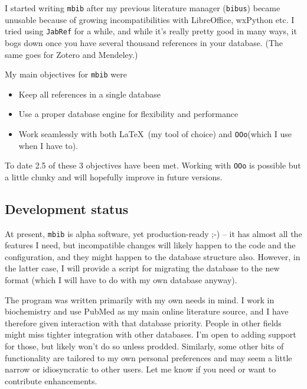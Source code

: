 \documentclass[10pt]{article}
\newcommand*{\mbib}{\texttt{mbib}\xspace}
\newcommand*{\jabref}{\texttt{JabRef}\xspace}
\newcommand*{\ooo}{\texttt{OOo}\xspace}
\begin{document}
I started writing \mbib after my previous literature manager (\texttt{bibus}) became unusable because of growing incompatibilities with LibreOffice, wxPython etc. I tried using \jabref for a while, and while it's really pretty good in many ways, it bogs down once you have several thousand references in your database. (The same goes for Zotero and Mendeley.)

\medskip

\noindent My main objectives for \mbib were 

\begin{itemize}
\item Keep all references in a single database
\item Use a proper database engine for flexibility and performance
\item Work seamlessly with both \LaTeX\ (my tool of choice) and \ooo (which I use when I have to). 
\end{itemize}

\noindent To date 2.5 of these 3 objectives have been met. Working with \ooo is possible but a little clunky and will hopefully improve in future versions. 

%

\subsection{Development status}

At present, \mbib is alpha software, yet production-ready ;-) -- it has almost all the features I need, but incompatible changes will likely happen to the code and the configuration, and they might happen to the database structure also. However, in the latter case, I will provide a script for migrating the database to the new format (which I will have to do with my own database anyway). 

The program was written primarily with my own needs in mind. I work in biochemistry and use PubMed as my main online literature source, and I have therefore given interaction with that database priority. People in other fields might miss tighter integration with other databases. I'm open to adding support for those, but likely won't do so unless prodded. Similarly, some other bits of functionality are tailored to my own personal preferences and may seem a little narrow or idiosyncratic to other users. Let me know if you need or want to contribute enhancements. 
\end{document}

